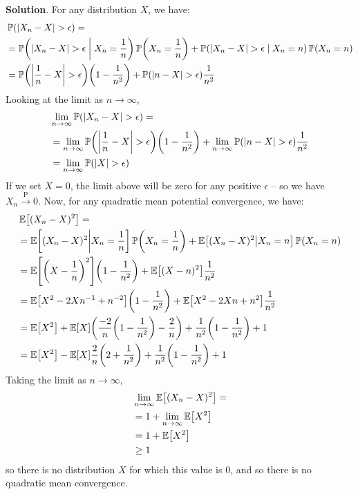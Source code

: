 \textbf{Solution}.
For any distribution \(X\), we have:
\begin{align*}
& \PROB( |X_{n} - X| > \epsilon ) = \\
&= \PROB\left( |X_{n} - X| > \epsilon \;\middle|\; X_{n} = \frac{1}{n} \right)\PROB\left(X_{n} = \frac{1}{n}\right)
  + \PROB\left( |X_{n} - X| > \epsilon \;\middle|\; X_{n} = n \right)\PROB\left(X_{n} = n\right) \\
&= \PROB\left( \middle|\frac{1}{n} - X\middle|\; > \epsilon \right)\left(1 - \frac{1}{n^{2}} \right)
  + \PROB\left( |n - X| > \epsilon \right)\frac{1}{n^{2}}
\end{align*}
Looking at the limit as \(n \rightarrow \infty\),
\begin{align*}
& \lim _{n \rightarrow \infty} \PROB( |X_{n} - X| > \epsilon ) = \\
& = \lim _{n \rightarrow \infty} \PROB\left( \middle|\frac{1}{n} - X\middle|\; > \epsilon \right)\left(1 - \frac{1}{n^{2}} \right)
  + \lim _{n \rightarrow \infty} \PROB\left( |n - X| > \epsilon \right)\frac{1}{n^{2}} \\
& = \lim _{n \rightarrow \infty} \PROB\left( |X| > \epsilon \right)
\end{align*}
If we set \(X = 0\), the limit above will be zero for any positive
\(\epsilon\) -- so we have \(X_{n} \xrightarrow{\textrm{P}} 0\).
Now, for any quadratic mean potential convergence, we have:
\begin{align*}
& \EXP\left[(X_{n} - X)^{2}\right] = \\
& = \EXP\left[(X_{n} - X)^{2} \bigg| X_{n} = \frac{1}{n} \right] \PROB\left(X_{n} = \frac{1}{n}\right)
   + \EXP\left[(X_{n} - X)^{2} \big| X_{n} = n \right] \PROB\left(X_{n} = n\right) \\
& = \EXP\left[\left(X - \frac{1}{n}\right)^{2}  \right] \left(1 - \frac{1}{n^{2}}\right)
   + \EXP\left[(X - n)^{2}  \right] \frac{1}{n^{2}} \\
& = \EXP\left[X^{2} - 2Xn^{-1} + n^{-2} \right] \left(1 - \frac{1}{n^{2}}\right)
   + \EXP\left[X^{2} - 2Xn + n^{2} \right] \frac{1}{n^{2}} \\
& = \EXP\left[X^{2}\right] + \EXP\left[X\right] \left(\frac{-2}{n} \left(1 - \frac{1}{n^{2}} \right) -\frac{2}{n}\right) + \frac{1}{n^{2}} \left(1 - \frac{1}{n^{2}} \right) + 1 \\
& = \EXP\left[X^{2}\right] - \EXP\left[X\right] \frac{2}{n} \left( 2 + \frac{1}{n^{2}} \right) + \frac{1}{n^{2}} \left(1 - \frac{1}{n^{2}} \right) + 1
\end{align*}
Taking the limit as \(n \rightarrow \infty\),
\begin{align*}
& \lim _{n \rightarrow \infty} \EXP\left[(X_{n} - X)^{2}\right] = \\
& = 1 + \lim _{n \rightarrow \infty} \EXP\left[X^{2}\right] \\
& = 1 + \EXP\left[X^{2}\right] \\
& \geq 1
\end{align*}
so there is no distribution \(X\) for which this value is 0, and so
there is no quadratic mean convergence.

